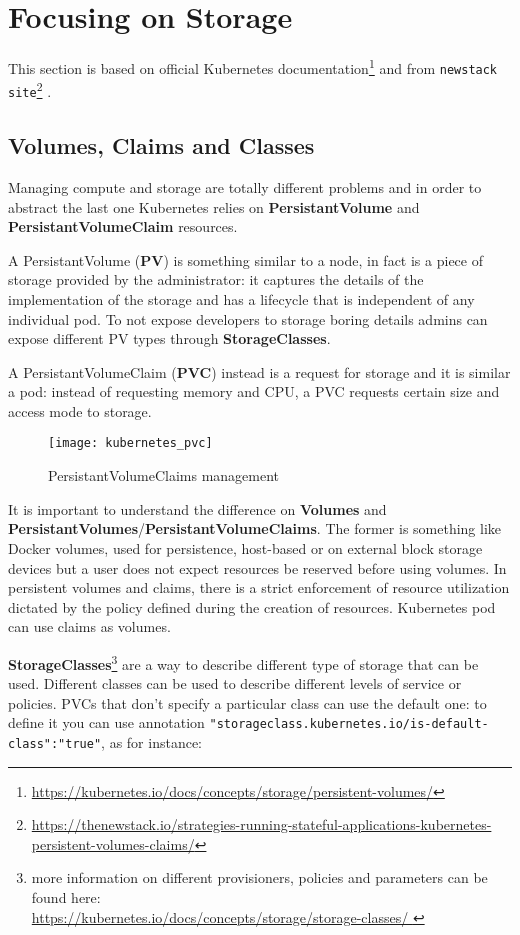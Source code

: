 \section{Focusing on Storage}
\label{focusing-on-storage}

This section is based on official Kubernetes documentation\footnote{
\url{https://kubernetes.io/docs/concepts/storage/persistent-volumes/}} and
from \texttt{newstack site}\footnote{
\sloppy
\url{https://thenewstack.io/strategies-running-stateful-applications-kubernetes-persistent-volumes-claims/}}
.

\subsection{Volumes, Claims and Classes}
\label{volumes-claims-and-classes}

Managing compute and storage are totally different problems and in order
to abstract the last one Kubernetes relies on \textbf{PersistantVolume}
and \textbf{PersistantVolumeClaim} resources.

A PersistantVolume (\textbf{PV}) is something similar to a node, in fact
is a piece of storage provided by the administrator: it captures the
details of the implementation of the storage and has a lifecycle that is
independent of any individual pod. To not expose developers to storage
boring details admins can expose different PV types through
\textbf{StorageClasses}.

A PersistantVolumeClaim (\textbf{PVC}) instead is a request for storage
and it is similar a pod: instead of requesting memory and CPU, a PVC
requests certain size and access mode to storage.

\begin{figure}[htbp]
\centering
\texttt{[image: kubernetes\_pvc]}
\caption{PersistantVolumeClaims management}
\end{figure}

It is important to understand the difference on \textbf{Volumes} and
\textbf{PersistantVolumes}/\textbf{PersistantVolumeClaims}. The former is
something like Docker volumes, used for persistence, host-based or on external
block storage devices but a user does not expect resources be reserved before
using volumes. In persistent volumes and claims, there is a strict enforcement
of resource utilization dictated by the policy defined during the
creation of resources. Kubernetes pod can use claims as volumes.

\textbf{StorageClasses}\footnote{more information on different provisioners,
policies and parameters can be found here: \\\url{
https://kubernetes.io/docs/concepts/storage/storage-classes/
}} are a way to describe different type of storage
that can be used. Different classes can be used to describe different
levels of service or policies. PVCs that don't specify a particular class
can use the default one: to define it you can use annotation
\verb!"storageclass.kubernetes.io/is-default-class":"true"!, as for
instance:

